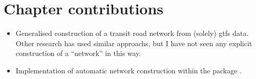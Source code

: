 






\section{Chapter contributions}
\label{sec:data_contrib}

\begin{itemize}
\item Generalised construction of a transit road network from (solely) \gls{gtfs} data. Other research has used similar approachs, but I have not seen any explicit construction of a ``network'' in this way.
\item Implementation of automatic network construction within the  package .
\end{itemize}
